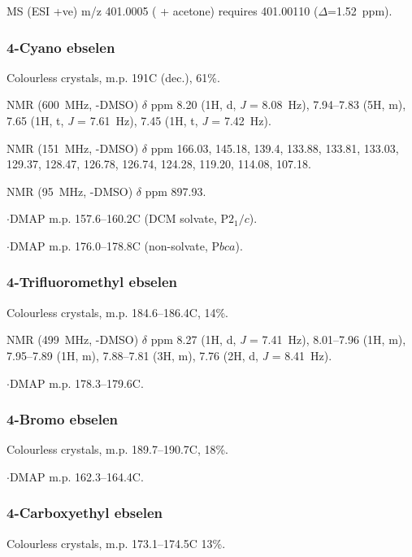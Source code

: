 \begin{refsection}
MS (ESI +ve) m/z 401.0005 ( + acetone)  requires 401.00110 ($\Delta$=1.52~ppm).

\subsubsection{4-Cyano ebselen }
Colourless crystals, m.p. 191\degree C (dec.), 61\%.

 NMR (600~MHz, -DMSO) $\delta$ ppm 8.20 (1H, d, \emph{J} = 8.08~Hz), 7.94--7.83 (5H, m), 7.65 (1H, t, \emph{J} = 7.61~Hz), 7.45 (1H, t, \emph{J} = 7.42~Hz).

 NMR (151~MHz, -DMSO) $\delta$ ppm 166.03, 145.18, 139.4, 133.88, 133.81, 133.03, 129.37, 128.47, 126.78, 126.74, 124.28, 119.20, 114.08, 107.18.

 NMR (95~MHz, -DMSO) $\delta$ ppm 897.93.

$\cdot$DMAP m.p. 157.6--160.2\degree C (DCM solvate, P$2_1/c$).

$\cdot$DMAP m.p. 176.0--178.8\degree C (non-solvate, P$bca$).

\subsubsection{4-Trifluoromethyl ebselen }
Colourless crystals, m.p. 184.6--186.4\degree C, 14\%.

 NMR (499~MHz, -DMSO) $\delta$ ppm 8.27 (1H, d, \emph{J} = 7.41~Hz), 8.01--7.96 (1H, m), 7.95--7.89 (1H, m), 7.88--7.81 (3H, m), 7.76 (2H, d, \emph{J} = 8.41~Hz).

$\cdot$DMAP m.p. 178.3--179.6\degree C.

\subsubsection{4-Bromo ebselen }
Colourless crystals, m.p. 189.7--190.7\degree C, 18\%.

$\cdot$DMAP m.p. 162.3--164.4\degree C.

\subsubsection{4-Carboxyethyl ebselen }
Colourless crystals, m.p. 173.1--174.5\degree C 13\%.


\end{refsection}
